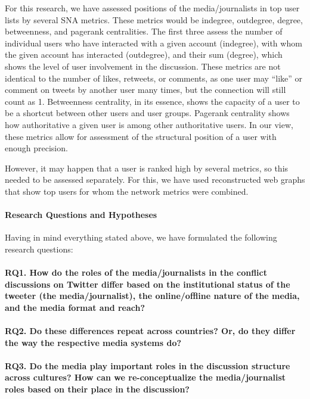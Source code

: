 For this research, we have assessed positions of the media/journalists in top user lists by several SNA metrics. These metrics would be indegree, outdegree, degree, betweenness, and pagerank centralities. The first three assess the number of individual users who have interacted with a given account (indegree), with whom the given account has interacted (outdegree), and their sum (degree), which shows the level of user involvement in the discussion. These metrics are not identical to the number of likes, retweets, or comments, as one user may “like” or comment on tweets by another user many times, but the connection will still count as 1. Betweenness centrality, in its essence, shows the capacity of a user to be a shortcut between other users and user groups. Pagerank centrality shows how authoritative a given user is among other authoritative users. In our view, these metrics allow for assessment of the structural position of a user with enough precision.

However, it may happen that a user is ranked high by several metrics, so this needed to be assessed separately. For this, we have used reconstructed web graphs that show top users for whom the network metrics were combined.

\paragraph{Research Questions and Hypotheses}
Having in mind everything stated above, we have formulated the following research questions:

\paragraph{RQ1. How do the roles of the media/journalists in the conflict discussions on Twitter differ based on the institutional status of the tweeter (the media/journalist), the online/offline nature of the media, and the media format and reach?}

\paragraph{RQ2. Do these differences repeat across countries? Or, do they differ the way the respective media systems do?}

\paragraph{RQ3. Do the media play important roles in the discussion structure across cultures? How can we re-conceptualize the media/journalist roles based on their place in the discussion?}

